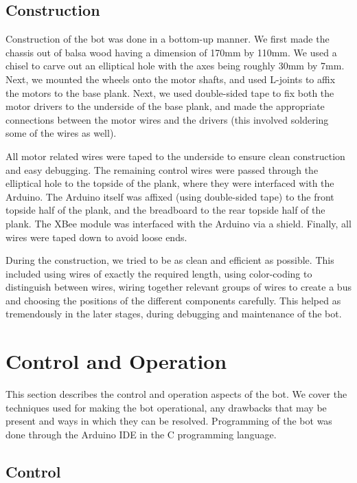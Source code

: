 \documentclass[a4paper]{article}
\begin{document}
\subsection{Construction}

Construction of the bot was done in a bottom-up manner. We first made the chassis out of balsa wood having a dimension of 170mm by 110mm. We used a chisel to carve out an elliptical hole with the axes being roughly 30mm by 7mm. Next, we mounted the wheels onto the motor shafts, and used L-joints to affix the motors to the base plank. Next, we used double-sided tape to fix both the motor drivers to the underside of the base plank, and made the appropriate connections between the motor wires and the drivers (this involved soldering some of the wires as well). 

All motor related wires were taped to the underside to ensure clean construction and easy debugging. The remaining control wires were passed through the elliptical hole to the topside of the plank, where they were interfaced with the Arduino. The Arduino itself was affixed (using double-sided tape) to the front topside half of the plank, and the breadboard to the rear topside half of the plank. The XBee module was interfaced with the Arduino via a shield. Finally, all wires were taped down to avoid loose ends.

During the construction, we tried to be as clean and efficient as possible. This included using wires of exactly the required length, using color-coding to distinguish between wires, wiring together relevant groups of wires to create a bus and choosing the positions of the different components carefully. This helped as tremendously in the later stages, during debugging and maintenance of the bot.

\section{Control and Operation}

This section describes the control and operation aspects of the bot. We cover the techniques used for making the bot operational, any drawbacks that may be present and ways in which they can be resolved. Programming of the bot was done through the Arduino IDE in the C programming language.

\subsection{Control}
\end{document}
